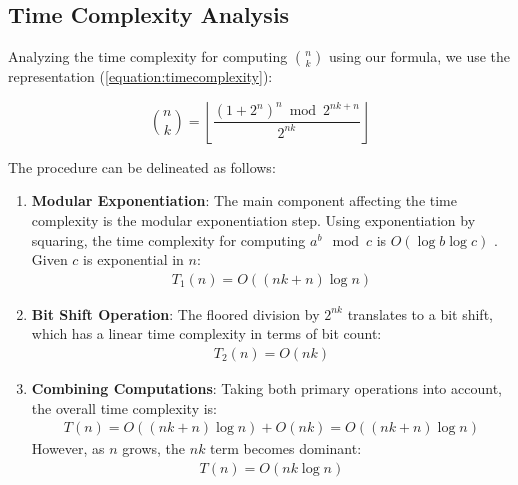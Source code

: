 \documentclass{article}
\theoremstyle{plain}
\theoremstyle{definition}
\begin{document}
\subsection{Time Complexity Analysis}
Analyzing the time complexity for computing $\binom{n}{k}$ using our formula, we use the representation (\ref{equation:timecomplexity}):

\begin{equation*}
    \binom{n}{k} = \left\lfloor\frac{(1 + 2^{n})^{n} \bmod 2^{n k + n}}{2^{n k}}\right\rfloor
\end{equation*}

The procedure can be delineated as follows:
\begin{enumerate}
    \item \textbf{Modular Exponentiation}: The main component affecting the time complexity is the modular exponentiation step. Using exponentiation by squaring, the time complexity for computing \(a^b \mod c\) is \(O(\log{b} \log{c})\) \cite{koblitz1994course}. Given \(c\) is exponential in \(n\):
    \begin{align}
        T_1(n) = O((nk + n) \log{n})
    \end{align}
    \item \textbf{Bit Shift Operation}: The floored division by \(2^{nk}\) translates to a bit shift, which has a linear time complexity in terms of bit count:
    \begin{align}
        T_2(n) = O(nk)
    \end{align}
    \item \textbf{Combining Computations}: Taking both primary operations into account, the overall time complexity is:
    \begin{align}
        T(n) = O((nk + n) \log{n}) + O(nk) = O((nk + n) \log{n})
    \end{align}
    However, as \(n\) grows, the \(nk\) term becomes dominant:
    \begin{align}
        T(n) = O(nk \log{n})
    \end{align}
\end{enumerate}
\end{document}
